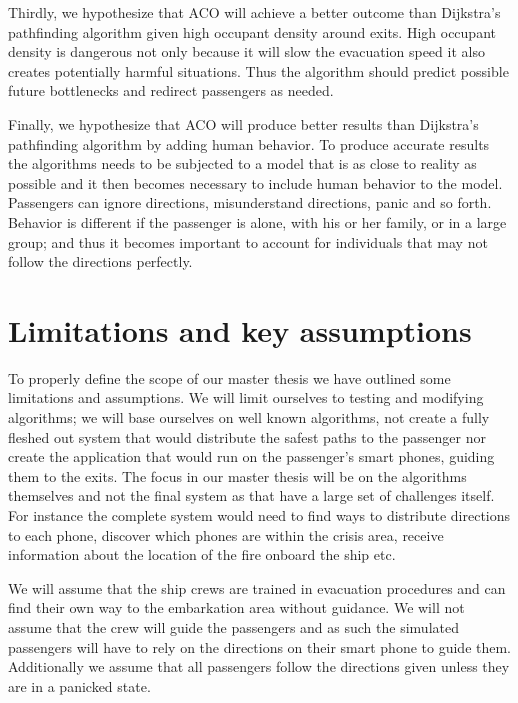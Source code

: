 Thirdly, we hypothesize that ACO will achieve a better outcome than Dijkstra's pathfinding algorithm
given high occupant density around exits. High occupant density is dangerous not only
because it will slow the evacuation speed it also creates potentially harmful situations. Thus the algorithm
should predict possible future bottlenecks and redirect passengers as needed.

Finally, we hypothesize that ACO will produce better results than Dijkstra's pathfinding algorithm                 
by adding human behavior. To produce accurate results the algorithms needs to be subjected
to a model that is as close to reality as possible and it then becomes necessary to include
human behavior to the model. Passengers can ignore directions, misunderstand directions, panic
and so forth. Behavior is different if the passenger is alone, with his or her family, or in a large group;
and thus it becomes important to account for individuals that may not follow the directions perfectly.

\section{Limitations and key assumptions}

To properly define the scope of our master thesis we have outlined                                                                              
some limitations and assumptions. We will limit ourselves to testing and modifying algorithms;                                  
we will base ourselves on well known algorithms, not create a fully fleshed out system that would distribute the 
safest paths to the passenger nor create the application that would run on the passenger's smart phones, guiding them to the exits.
The focus in our master thesis will be on the algorithms themselves and not the final system as that have a large set
of challenges itself. For instance the complete system would need to find ways to distribute directions to each phone,
discover which phones are within the crisis area, receive information about the location of the fire onboard the ship etc.

We will assume that the ship crews are trained in evacuation procedures and can find their own way to the embarkation area without guidance.
We will not assume that the crew will guide the passengers and as such the simulated passengers will have to rely on the directions on 
their smart phone to guide them. Additionally we assume that all passengers follow the directions given unless they are in a panicked state.

